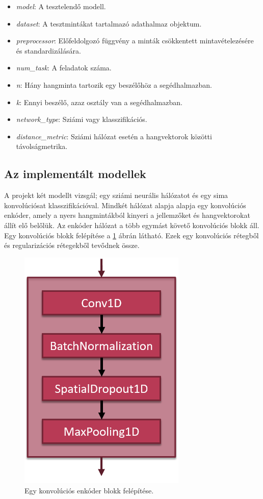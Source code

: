 \begin{itemize}
	\begin{itemize}
		\item  \emph{model}: A tesztelendő modell.
		\item  \emph{dataset}: A tesztmintákat tartalmazó adathalmaz objektum.
		\item  \emph{preprocessor}: Előfeldolgozó függvény a minták csökkentett mintavételezésére és standardizálására.
		\item  \emph{num\_task}: A feladatok száma.
		\item  \emph{n}: Hány hangminta tartozik egy beszélőhöz a segédhalmazban.
		\item  \emph{k}: Ennyi beszélő, azaz osztály van a segédhalmazban.
		\item  \emph{network\_type}: Sziámi vagy klasszifikációs.
		\item  \emph{distance\_metric}: Sziámi hálózat esetén a hangvektorok közötti távolságmetrika.
	\end{itemize}
\end{itemize}

\subsection{Az implementált modellek}

A projekt két modellt vizsgál; egy sziámi neurális hálózatot és egy sima konvolúciósat klasszifikációval. Mindkét hálózat alapja alapja egy konvolúciós enkóder, amely a nyers hangmintákból kinyeri a jellemzőket és hangvektorokat állít elő belőlük. Az enkóder hálózat a több egymást követő konvolúciós blokk áll. Egy konvolúciós blokk felépítése a \ref{fig:conv_encoder_block} ábrán látható. Ezek egy konvolúciós rétegből és regularizációs
rétegekből tevődnek össze.

\begin{figure}[!ht]
	\centering
	\includegraphics[width=80mm, keepaspectratio]{figures/conv_encoder_block.png}
	\caption{Egy konvolúciós enkóder blokk felépítése.}
	\label{fig:conv_encoder_block}
\end{figure}

